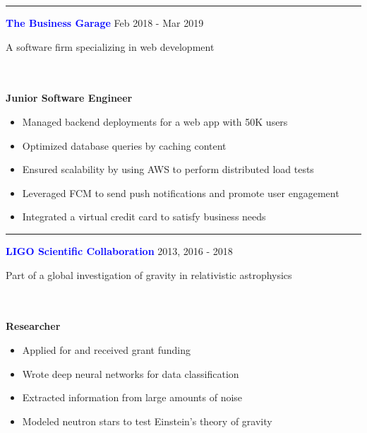 \documentclass[12pt]{resume}
\begin{document}
\begin{minipage}[t]{0.6\textwidth}
        \vspace{-.5em}
        \rule{\textwidth}{0.1pt}
        \vspace{.1em}

        {\bf \textcolor{blue}{The Business Garage}} {\hfill Feb 2018 - Mar 2019}
        {\par A software firm specializing in web development}\\\\
        {\bf Junior Software Engineer}
        \begin{itemize}
            \setlength\itemsep{-.2em}
            \item {Managed backend deployments for a web app with 50K users}
            \item {Optimized database queries by caching content}
            \item {Ensured scalability by using AWS to perform distributed load tests}
            \item {Leveraged FCM to send push notifications and promote user engagement}
            \item {Integrated a virtual credit card to satisfy business needs}
        \end{itemize}

        \vspace{-.5em}
        \rule{\textwidth}{0.1pt}
        \vspace{.1em}

        {\bf\textcolor{blue}{LIGO Scientific Collaboration}} {\hfill 2013, 2016 - 2018}
        {\par Part of a global investigation of gravity in relativistic astrophysics}\\\\
        {\bf Researcher}
        \begin{itemize}
            \setlength\itemsep{-.2em}
            \item {Applied for and received grant funding}
            \item {Wrote deep neural networks for data classification}
            \item {Extracted information from large amounts of noise}
            \item {Modeled neutron stars to test Einstein’s theory of gravity}
        \end{itemize}
    \end{minipage}
    \hspace{.3in}
\end{document}
